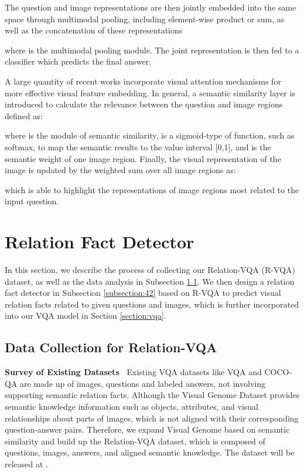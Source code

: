 \documentclass[sigconf]{acmart}
\begin{document}
The question and image representations are then jointly embedded into the same space through multimodal pooling, including element-wise product or sum, as well as the concatenation of these representations

where  is the multimodal pooling module. The joint representation  is then fed to a classifier which predicts the final answer.


A large quantity of recent works incorporate visual attention mechanisms for more effective visual feature embedding. In general, a semantic similarity layer is introduced to calculate the relevance between the question and image regions defined as:

where  is the module of semantic similarity,  is a sigmoid-type of function, such as softmax, to map the semantic results to the value interval [0,1], and  is the semantic weight of one image region. Finally, the visual representation of the image is updated by the weighted sum over all image regions as:

which is able to highlight the representations of image regions most related to the input question.

\section{Relation Fact Detector} \label{section:4} 
In this section, we describe the process of collecting our Relation-VQA (R-VQA) dataset,
as well as the data analysis in Subsection \ref{subsection:41}.
We then design a relation fact detector in Subsection \ref{subsection:42} based on R-VQA to predict
visual relation facts related to given questions and images,
which is further incorporated into our VQA model in Section \ref{section:vqa}.





\subsection{Data Collection for Relation-VQA} \label{subsection:41} 
\textbf{Survey of Existing Datasets~} Existing VQA datasets like VQA \cite{antol2015vqa} and COCO-QA \cite{ren2015exploring}
are made up of images, questions and labeled answers, not involving supporting semantic relation facts.
Although the Visual Genome Dataset \cite{krishna2017visual} provides semantic knowledge information such as objects,
attributes, and visual relationships about parts of images, which is not aligned with their corresponding question-answer pairs.
Therefore, we expand Visual Genome based on semantic similarity and build up the Relation-VQA dataset,
which is composed of questions, images, answers, and aligned semantic knowledge. 
The dataset will be released at 
{
}\!.  
\end{document}
